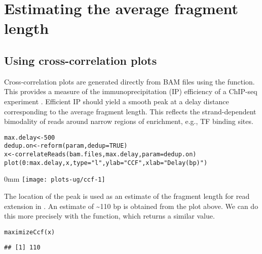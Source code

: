 \documentclass{report}\usepackage[]{graphicx}\usepackage[usenames,dvipsnames]{color}
\makeatletter
\def\maxwidth{ %
  \ifdim\Gin@nat@width>\linewidth
    \linewidth
  \else
    \Gin@nat@width
  \fi
}
\newcommand{\hlnum}[1]{\textcolor[rgb]{0.816,0.125,0.439}{#1}}%
\newcommand{\hlstr}[1]{\textcolor[rgb]{0.251,0.627,0.251}{#1}}%
\newcommand{\hlopt}[1]{\textcolor[rgb]{0,0,0}{#1}}%
\newcommand{\hlstd}[1]{\textcolor[rgb]{0.251,0.251,0.251}{#1}}%
\newcommand{\hlkwb}[1]{\textcolor[rgb]{0,0,0}{#1}}%
\newcommand{\hlkwc}[1]{\textcolor[rgb]{0.251,0.251,0.251}{#1}}%
\newcommand{\hlkwd}[1]{\textcolor[rgb]{0.878,0.439,0.125}{#1}}%
\newenvironment{knitrout}{}{} %
\makeatother
\begin{document}
\section{Estimating the average fragment length}
\label{sec:ccf}

\subsection{Using cross-correlation plots}
Cross-correlation plots are generated directly from BAM files using the  function. 
This provides a measure of the immunoprecipitation (IP) efficiency of a ChIP-seq experiment \cite{kharchenko2008}. 
Efficient IP should yield a smooth peak at a delay distance corresponding to the average fragment length. 
This reflects the strand-dependent bimodality of reads around narrow regions of enrichment, e.g., TF binding sites. 

\begin{knitrout}
\color{fgcolor}\begin{kframe}
\begin{alltt}
\hlstd{max.delay} \hlkwb{<-} \hlnum{500}
\hlstd{dedup.on} \hlkwb{<-} \hlkwd{reform}\hlstd{(param,} \hlkwc{dedup}\hlstd{=}\hlnum{TRUE}\hlstd{)}
\hlstd{x} \hlkwb{<-} \hlkwd{correlateReads}\hlstd{(bam.files, max.delay,} \hlkwc{param}\hlstd{=dedup.on)}
\hlkwd{plot}\hlstd{(}\hlnum{0}\hlopt{:}\hlstd{max.delay, x,} \hlkwc{type}\hlstd{=}\hlstr{"l"}\hlstd{,} \hlkwc{ylab}\hlstd{=}\hlstr{"CCF"}\hlstd{,} \hlkwc{xlab}\hlstd{=}\hlstr{"Delay (bp)"}\hlstd{)}
\end{alltt}
\end{kframe}\begin{adjustwidth}{\fltoffset}{0mm}
\texttt{[image: plots-ug/ccf-1]} \end{adjustwidth}
\end{knitrout}

The location of the peak is used as an estimate of the fragment length for read extension in . 
An estimate of \textasciitilde{}110 bp is obtained from the plot above.
We can do this more precisely with the  function, which returns a similar value.

\begin{knitrout}
\color{fgcolor}\begin{kframe}
\begin{alltt}
\hlkwd{maximizeCcf}\hlstd{(x)}
\end{alltt}
\begin{verbatim}
## [1] 110
\end{verbatim}
\end{kframe}
\end{knitrout}
\end{document}

